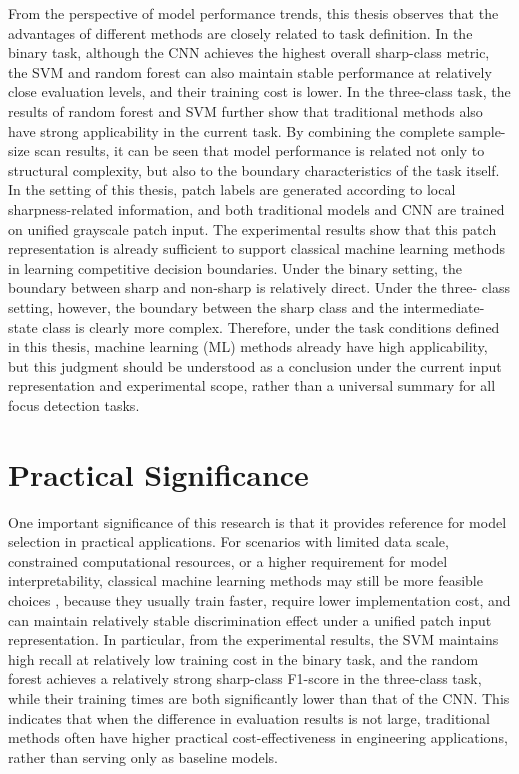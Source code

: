\par From the perspective of model performance trends, this thesis observes
that the advantages of different methods are closely related to task
definition. In the binary task, although the CNN achieves the highest overall
sharp-class metric, the SVM and random forest can also maintain stable
performance at relatively close evaluation levels, and their training cost is
lower. In the three-class task, the results of random forest and SVM further
show that traditional methods also have strong applicability in the current
task. By combining the complete sample-size scan results, it can be seen that
model performance is related not only to structural complexity, but also to
the boundary characteristics of the task itself. In the setting of this
thesis, patch labels are generated according to local sharpness-related
information, and both traditional models and CNN are trained on unified
grayscale patch input. The experimental results show that this patch
representation is already sufficient to support classical machine learning
methods in learning competitive decision boundaries. Under the binary setting,
the boundary between sharp and non-sharp is relatively direct. Under the three-
class setting, however, the boundary between the sharp class and the
intermediate-state class is clearly more complex. Therefore, under the task
conditions defined in this thesis, machine learning (ML) methods already have
high applicability, but this judgment should be understood as a conclusion
under the current input representation and experimental scope, rather than a
universal summary for all focus detection tasks.

\section{Practical Significance}
\par One important significance of this research is that it provides reference
for model selection in practical applications. For scenarios with limited data
scale, constrained computational resources, or a higher requirement for model
interpretability, classical machine learning methods may still be more feasible
choices \cite{murphy2022pml}, because they usually train faster, require lower
implementation cost, and can maintain relatively stable discrimination effect
under a unified patch input representation. In particular, from the
experimental results, the SVM maintains high recall at relatively low training
cost in the binary task, and the random forest achieves a relatively strong
sharp-class F1-score in the three-class task, while their training times are
both significantly lower than that of the CNN. This indicates that when the
difference in evaluation results is not large, traditional methods often have
higher practical cost-effectiveness in engineering applications, rather than
serving only as baseline models.

